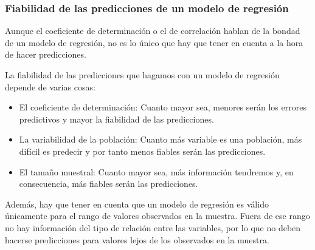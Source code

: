 \begin{frame}
\frametitle{Fiabilidad de las predicciones de un modelo de regresión}
Aunque el coeficiente de determinación o el de correlación hablan de la bondad de un modelo de regresión, no es lo único que hay que
tener en cuenta a la hora de hacer predicciones.

La fiabilidad de las predicciones que hagamos con un modelo de regresión depende de varias cosas:
\begin{itemize}
\item El coeficiente de determinación: Cuanto mayor sea, menores serán los errores predictivos y mayor la fiabilidad de las predicciones.
\item La variabilidad de la población: Cuanto más variable es una población, más difícil es predecir y por tanto menos fiables serán las
predicciones.
\item El tamaño muestral: Cuanto mayor sea, más información tendremos y, en consecuencia, más fiables serán las predicciones. 
\end{itemize} 

Además, hay que tener en cuenta que un modelo de regresión es válido únicamente para el rango de valores observados en la muestra.
Fuera de ese rango no hay información del tipo de relación entre las variables, por lo que no deben hacerse predicciones para valores lejos
de los observados en la muestra.

\end{frame}


